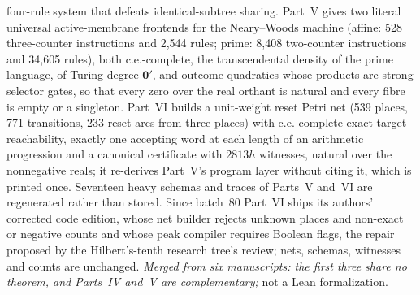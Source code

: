 \documentclass[11pt]{article}
\begin{document}
{four-rule system that defeats identical-subtree sharing.  Part~V gives two
literal universal active-membrane frontends for the Neary--Woods machine
(affine: 528 three-counter instructions and 2{,}544 rules; prime: 8{,}408
two-counter instructions and 34{,}605 rules), both c.e.-complete, the
transcendental density of the prime language, of Turing degree
$\mathbf 0'$, and outcome quadratics whose products are strong selector
gates, so that every zero over the real orthant is natural and every fibre
is empty or a singleton.  Part~VI builds a unit-weight reset Petri net (539
places, 771 transitions, 233 reset arcs from three places) with
c.e.-complete exact-target reachability, exactly one accepting word at each
length of an arithmetic progression and a canonical certificate with $2813h$
witnesses, natural over the nonnegative reals; it re-derives Part~V's
program layer without citing it, which is printed once.  Seventeen heavy
schemas and traces of Parts~V and~VI are regenerated rather than stored.
Since batch~80 Part~VI ships its authors' corrected code edition, whose
net builder rejects unknown places and non-exact or negative counts and
whose peak compiler requires Boolean flags, the repair proposed by the Hilbert's-tenth research tree's
review; nets, schemas, witnesses and counts are unchanged.  \emph{Merged from six manuscripts: the first three
share no theorem, and Parts~IV and~V are complementary;} not a Lean
formalization.}
\end{document}
